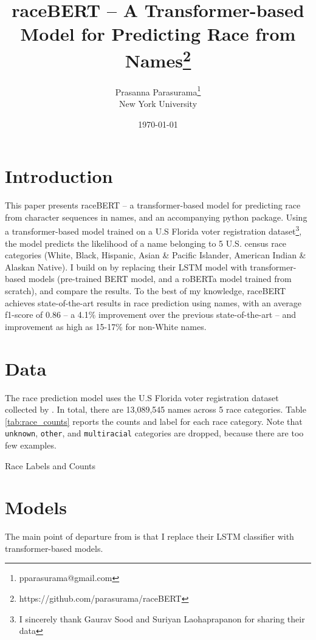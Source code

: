 \documentclass[11pt]{article}
\begin{document}
\title{raceBERT -- A Transformer-based Model for Predicting Race from Names\footnote{https://github.com/parasurama/raceBERT}}
\author{Prasanna Parasurama\thanks{pparasurama@gmail.com} \\ New York University}
\date{\today}
\maketitle

\section{Introduction}

This paper presents raceBERT -- a transformer-based model for predicting race from character sequences in names, and an accompanying python package.
Using a transformer-based model trained on a U.S Florida voter registration dataset\footnote{I sincerely thank Gaurav Sood and Suriyan Laohaprapanon for sharing their data}, the model predicts the likelihood of a name belonging to 5 U.S. census race categories (White, Black, Hispanic, Asian \& Pacific Islander, American Indian \& Alaskan Native).
I build on \textcite{sood_predicting_2018} by replacing their LSTM model with transformer-based models (pre-trained BERT model, and a roBERTa model trained from scratch), and compare the results.
To the best of my knowledge, raceBERT achieves state-of-the-art results in race prediction using names, with an average f1-score of 0.86 -- a 4.1\% improvement over the previous state-of-the-art -- and improvement as high as 15-17\% for non-White names.

\section{Data}
The race prediction model uses the U.S Florida voter registration dataset collected by \textcite{sood_predicting_2018}.
In total, there are 13,089,545 names across 5 race categories.
Table \ref{tab:race_counts} reports the counts and label for each race category.
Note that \texttt{unknown}, \texttt{other}, and \texttt{multiracial} categories are dropped, because there are too few examples.

\begin{table}[H]
 \centering
 
 \caption{Race Labels and Counts}
 \label{tab:race_counts}
\end{table}

\section{Models}
The main point of departure from \textcite{sood_predicting_2018} is that I replace their LSTM classifier with transformer-based models.
\end{document}
